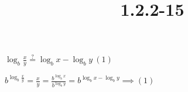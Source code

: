 \documentclass{article}
\title{1.2.2-15}
\begin{document}
\maketitle

$\log_b{\frac{x}{y}} \overset{?}{=} \log_b{x} - \log_b{y}\ (1)$

$b^{\log_b{\frac{x}{y}}} = \frac{x}{y} = \frac{b^{\log_b{x}}}{b^{\log_b{y}}} = b^{\log_b{x} - \log_b{y}} \implies (1)$
\end{document}
